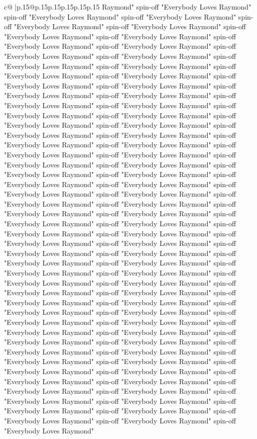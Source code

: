 \documentclass{article}
\begin{document}
{\begin{supertabular}{c@{$\;$}|p{.15\linewidth}@{}p{.15\linewidth}p{.15\linewidth}p{.15\linewidth}p{.15\linewidth}p{.15\linewidth}}
{{{Raymond" spin{-}off "Everybody Loves Raymond" spin{-}off "Everybody Loves Raymond" spin{-}off "Everybody Loves Raymond" spin{-}off "Everybody Loves Raymond" spin{-}off "Everybody Loves Raymond" spin{-}off "Everybody Loves Raymond" spin{-}off "Everybody Loves Raymond" spin{-}off "Everybody Loves Raymond" spin{-}off "Everybody Loves Raymond" spin{-}off "Everybody Loves Raymond" spin{-}off "Everybody Loves Raymond" spin{-}off "Everybody Loves Raymond" spin{-}off "Everybody Loves Raymond" spin{-}off "Everybody Loves Raymond" spin{-}off "Everybody Loves Raymond" spin{-}off "Everybody Loves Raymond" spin{-}off "Everybody Loves Raymond" spin{-}off "Everybody Loves Raymond" spin{-}off "Everybody Loves Raymond" spin{-}off "Everybody Loves Raymond" spin{-}off "Everybody Loves Raymond" spin{-}off "Everybody Loves Raymond" spin{-}off "Everybody Loves Raymond" spin{-}off "Everybody Loves Raymond" spin{-}off "Everybody Loves Raymond" spin{-}off "Everybody Loves Raymond" spin{-}off "Everybody Loves Raymond" spin{-}off "Everybody Loves Raymond" spin{-}off "Everybody Loves Raymond" spin{-}off "Everybody Loves Raymond" spin{-}off "Everybody Loves Raymond" spin{-}off "Everybody Loves Raymond" spin{-}off "Everybody Loves Raymond" spin{-}off "Everybody Loves Raymond" spin{-}off "Everybody Loves Raymond" spin{-}off "Everybody Loves Raymond" spin{-}off "Everybody Loves Raymond" spin{-}off "Everybody Loves Raymond" spin{-}off "Everybody Loves Raymond" spin{-}off "Everybody Loves Raymond" spin{-}off "Everybody Loves Raymond" spin{-}off "Everybody Loves Raymond" spin{-}off "Everybody Loves Raymond" spin{-}off "Everybody Loves Raymond" spin{-}off "Everybody Loves Raymond" spin{-}off "Everybody Loves Raymond" spin{-}off "Everybody Loves Raymond" spin{-}off "Everybody Loves Raymond" spin{-}off "Everybody Loves Raymond" spin{-}off "Everybody Loves Raymond" spin{-}off "Everybody Loves Raymond" spin{-}off "Everybody Loves Raymond" spin{-}off "Everybody Loves Raymond" spin{-}off "Everybody Loves Raymond" spin{-}off "Everybody Loves Raymond" spin{-}off "Everybody Loves Raymond" spin{-}off "Everybody Loves Raymond" spin{-}off "Everybody Loves Raymond" spin{-}off "Everybody Loves Raymond" spin{-}off "Everybody Loves Raymond" spin{-}off "Everybody Loves Raymond" spin{-}off "Everybody Loves Raymond" spin{-}off "Everybody Loves Raymond" spin{-}off "Everybody Loves Raymond" spin{-}off "Everybody Loves Raymond" spin{-}off "Everybody Loves Raymond" spin{-}off "Everybody Loves Raymond" spin{-}off "Everybody Loves Raymond" spin{-}off "Everybody Loves Raymond" spin{-}off "Everybody Loves Raymond" spin{-}off "Everybody Loves Raymond" spin{-}off "Everybody Loves Raymond" spin{-}off "Everybody Loves Raymond" spin{-}off "Everybody Loves Raymond" spin{-}off "Everybody Loves Raymond" spin{-}off "Everybody Loves Raymond" spin{-}off "Everybody Loves Raymond" spin{-}off "Everybody Loves Raymond" spin{-}off "Everybody Loves Raymond" spin{-}off "Everybody Loves Raymond" spin{-}off "Everybody Loves Raymond" spin{-}off "Everybody Loves Raymond" spin{-}off "Everybody Loves Raymond" spin{-}off "Everybody Loves Raymond" spin{-}off "Everybody Loves Raymond" spin{-}off "Everybody Loves Raymond" }}}
\end{supertabular}}
\end{document}
